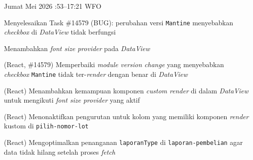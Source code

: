 \begin{logtable}
    {
        Jumat  Mei 2026 :53--17:21 \linebreak %
        WFO
    }{
        \begin{loglist}
            \item Menyelesaikan Task \#14579 (BUG): perubahan versi \texttt{Mantine} menyebabkan
            \textit{checkbox} di \textit{DataView} tidak berfungsi
            \item Menambahkan \textit{font size provider} pada \textit{DataView}
        \end{loglist}
    }{
        \begin{logwork}
            \item (React, \#14579) Memperbaiki \textit{module version change} yang menyebabkan \textit{checkbox} \texttt{Mantine} tidak ter-\textit{render} dengan benar di \textit{DataView}
            \item (React) Menambahkan kemampuan komponen \textit{custom render} di dalam \textit{DataView} untuk mengikuti \textit{font size provider} yang aktif
            \item (React) Menonaktifkan pengurutan untuk kolom yang memiliki komponen \textit{render} kustom di \texttt{pilih-nomor-lot}
            \item (React) Mengoptimalkan penanganan \texttt{laporanType} di \texttt{laporan-pembelian} agar data tidak hilang setelah proses \textit{fetch}
        \end{logwork}
    }



\end{logtable}
